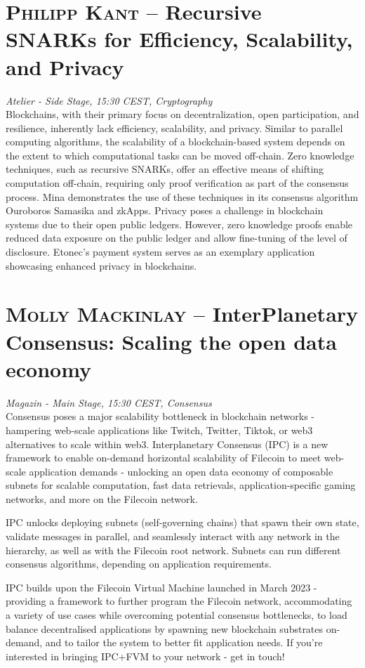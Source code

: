 \section {\textsc{Philipp Kant} -- Recursive SNARKs for Efficiency, Scalability, and Privacy
} \noindent \textit {Atelier - Side Stage, 15:30 CEST, Cryptography
}\\[1em] Blockchains, with their primary focus on decentralization, open participation, and resilience, inherently lack efficiency, scalability, and privacy. Similar to parallel computing algorithms, the scalability of a blockchain-based system depends on the extent to which computational tasks can be moved off-chain. Zero knowledge techniques, such as recursive SNARKs, offer an effective means of shifting computation off-chain, requiring only proof verification as part of the consensus process. Mina demonstrates the use of these techniques in its consensus algorithm Ouroboros Samasika and zkApps. Privacy poses a challenge in blockchain systems due to their open public ledgers. However, zero knowledge proofs enable reduced data exposure on the public ledger and allow fine-tuning of the level of disclosure. Etonec's payment system serves as an exemplary application showcasing enhanced privacy in blockchains.
\par \clearpage
\section {\textsc{Molly Mackinlay} -- InterPlanetary Consensus: Scaling the open data economy
} \noindent \textit {Magazin - Main Stage, 15:30 CEST, Consensus
}\\[1em] Consensus poses a major scalability bottleneck in blockchain networks - hampering web-scale applications like Twitch, Twitter, Tiktok, or web3 alternatives to scale within web3. Interplanetary Consensus (IPC) is a new framework to enable on-demand horizontal scalability of Filecoin to meet web-scale application demands - unlocking an open data economy of composable subnets for scalable computation, fast data retrievals, application-specific gaming networks, and more on the Filecoin network.
\par IPC unlocks deploying subnets (self-governing chains) that spawn their own state, validate messages in parallel, and seamlessly interact with any network in the hierarchy, as well as with the Filecoin root network. Subnets can run different consensus algorithms, depending on application requirements.

IPC builds upon the Filecoin Virtual Machine launched in March 2023 - providing a framework to further program the Filecoin network, accommodating a variety of use cases while overcoming potential consensus bottlenecks, to load balance decentralised applications by spawning new blockchain substrates on-demand, and to tailor the system to better fit application needs. If you're interested in bringing IPC+FVM to your network - get in touch!
\clearpage
